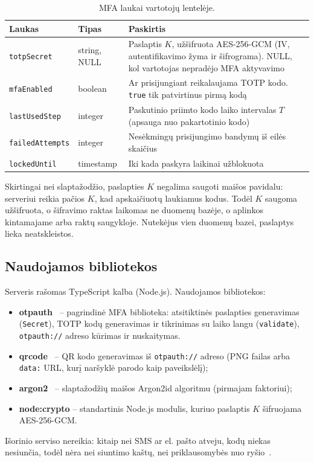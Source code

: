 \begin{table}[H]
    \centering
    \caption{MFA laukai vartotojų lentelėje.}
    \label{tab:db}
    \begin{tabularx}{\textwidth}{l l L}
        \toprule
        \textbf{Laukas} & \textbf{Tipas} & \textbf{Paskirtis} \\
        \midrule
        \texttt{totpSecret} & string, NULL & Paslaptis $K$, užšifruota AES-256-GCM (IV, autentifikavimo žyma ir šifrograma). NULL, kol vartotojas nepradėjo MFA aktyvavimo \\
        \texttt{mfaEnabled} & boolean & Ar prisijungiant reikalaujama TOTP kodo. \texttt{true} tik patvirtinus pirmą kodą \\
        \texttt{lastUsedStep} & integer & Paskutinio priimto kodo laiko intervalas $T$ (apsauga nuo pakartotinio kodo) \\
        \texttt{failedAttempts} & integer & Nesėkmingų prisijungimo bandymų iš eilės skaičius \\
        \texttt{lockedUntil} & timestamp & Iki kada paskyra laikinai užblokuota \\
        \bottomrule
    \end{tabularx}
\end{table}

Skirtingai nei slaptažodžio, paslapties $K$ negalima saugoti maišos pavidalu: serveriui reikia pačios $K$, kad apskaičiuotų laukiamus kodus. Todėl $K$ saugoma užšifruota, o šifravimo raktas laikomas ne duomenų bazėje, o aplinkos kintamajame arba raktų saugykloje. Nutekėjus vien duomenų bazei, paslaptys lieka neatskleistos.

\subsection{Naudojamos bibliotekos}
\label{subsec:biblioteka}

Serveris rašomas TypeScript kalba (Node.js). Naudojamos bibliotekos:
\begin{itemize}
    \item \textbf{otpauth}~\cite{otpauth} -- pagrindinė MFA biblioteka: atsitiktinės paslapties generavimas (\texttt{Secret}), TOTP kodų generavimas ir tikrinimas su laiko langu (\texttt{validate}), \texttt{otpauth://} adreso kūrimas ir nuskaitymas.
    \item \textbf{qrcode}~\cite{node_qrcode} -- QR kodo generavimas iš \texttt{otpauth://} adreso (PNG failas arba \texttt{data:} URL, kurį naršyklė parodo kaip paveikslėlį);
    \item \textbf{argon2}~\cite{node_argon2} -- slaptažodžių maišos Argon2id algoritmu (pirmajam faktoriui);
    \item \textbf{node:crypto} -- standartinis Node.js modulis, kuriuo paslaptis $K$ šifruojama AES-256-GCM.
\end{itemize}

Išorinio serviso nereikia: kitaip nei SMS ar el. pašto atveju, kodų niekas nesiunčia, todėl nėra nei siuntimo kaštų, nei priklausomybės nuo ryšio~\cite{VMA}.
